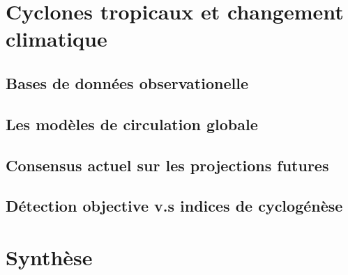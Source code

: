 \documentclass[../main.tex]{subfiles}
\begin{document}
\section{Cyclones tropicaux et changement climatique}

\subsection{Bases de données observationelle}

\subsection{Les modèles de circulation globale}

\subsection{Consensus actuel sur les projections futures}

\subsection{Détection objective v.s indices de cyclogénèse}

\section{Synthèse}
\end{document}

